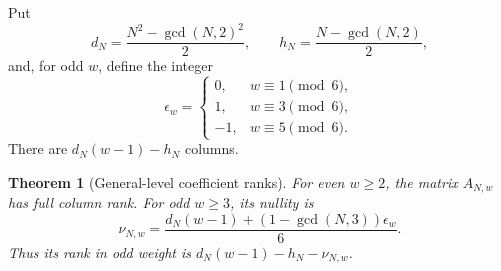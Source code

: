 \documentclass[11pt]{article}
\numberwithin{equation}{section}
\theoremstyle{plain}
\newtheorem{theorem}{Theorem}[section]
\theoremstyle{definition}
\theoremstyle{remark}
\begin{document}
Put
\[
 d_N=\frac{N^2-\gcd(N,2)^2}{2},\qquad
 h_N=\frac{N-\gcd(N,2)}2,
\]
and, for odd $w$, define the integer
\[
 \epsilon_w=\begin{cases}
 0,&w\equiv1\pmod6,\\
 1,&w\equiv3\pmod6,\\
 -1,&w\equiv5\pmod6.
 \end{cases}
\]
There are $d_N(w-1)-h_N$ columns.

\begin{theorem}[General-level coefficient ranks]\label{thm:general-level}
For even $w\ge2$, the matrix $A_{N,w}$ has full column rank. For odd
$w\ge3$, its nullity is
\[
 \boxed{\displaystyle
 \nu_{N,w}=\frac{d_N(w-1)+(1-\gcd(N,3))\epsilon_w}{6}.}
\]
Thus its rank in odd weight is
$d_N(w-1)-h_N-\nu_{N,w}$.
\end{theorem}
\end{document}
